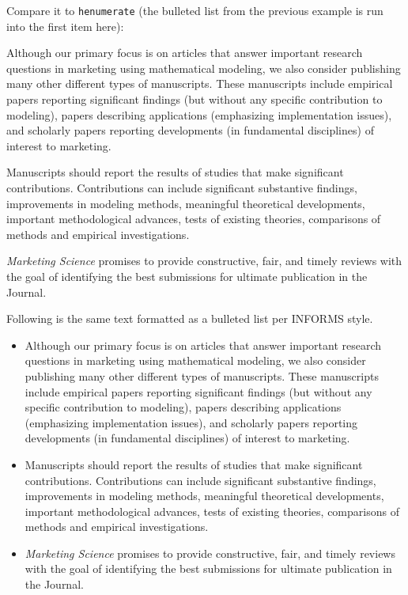 \documentclass[ijds,nonblindrev]{informs4}
\begin{document}
Compare it to \texttt{henumerate} (the bulleted list from the previous 
example is run into the first item here):
\begin{henumerate}
\item Although our primary focus is on articles that answer important research 
questions in marketing using mathematical modeling, we also consider 
publishing many other different types of manuscripts. These manuscripts 
include empirical papers reporting significant findings (but without any 
specific contribution to modeling), papers describing applications 
(emphasizing implementation issues), and scholarly papers reporting 
developments (in fundamental disciplines) of interest to marketing.

\item Manuscripts should report the results of studies that make significant 
contributions. Contributions can include significant substantive findings, 
improvements in modeling methods, meaningful theoretical developments, 
important methodological advances, tests of existing theories, comparisons 
of methods and empirical investigations.

\item {\it Marketing Science} promises to provide constructive, fair, and timely reviews with the goal of 
identifying the best submissions for ultimate publication in the Journal.


\end{henumerate}
Following is the same text formatted as a bulleted list per INFORMS style.

\begin{itemize}
\item Although our primary focus is on articles that answer important research 
questions in marketing using mathematical modeling, we also consider 
publishing many other different types of manuscripts. These manuscripts 
include empirical papers reporting significant findings (but without any 
specific contribution to modeling), papers describing applications 
(emphasizing implementation issues), and scholarly papers reporting 
developments (in fundamental disciplines) of interest to marketing.

\item Manuscripts should report the results of studies that make significant 
contributions. Contributions can include significant substantive findings, 
improvements in modeling methods, meaningful theoretical developments, 
important methodological advances, tests of existing theories, comparisons 
of methods and empirical investigations.

\item {\it Marketing Science} promises to provide constructive, fair, and timely reviews with the goal of 
identifying the best submissions for ultimate publication in the Journal.
\end{itemize}
\end{document}
